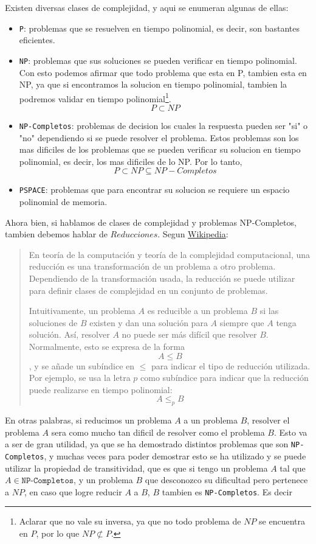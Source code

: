 Existen diversas clases de complejidad, y aqui se enumeran algunas de ellas:
\begin{itemize}
	\item \texttt{P}: problemas que se resuelven en tiempo polinomial, es decir, son bastantes eficientes.
	\item \texttt{NP}: problemas que sus soluciones se pueden verificar en tiempo polinomial. Con esto podemos afirmar que todo problema que esta en P, tambien esta en NP, ya que si encontramos la solucion en tiempo polinomial, tambien la podremos validar en tiempo polinomial\footnote{Aclarar que no vale su inversa, ya que no todo problema de $NP$ se encuentra en $P$, por lo que $NP \not\subset  P$.}.
    \[ P \subset NP\]
	\item \texttt{NP-Completos}: problemas de decision los cuales la respuesta pueden ser "si" o "no" dependiendo si se puede resolver el problema. Estos problemas son los mas dificiles de los problemas que se pueden verificar su solucion en tiempo polinomial, es decir, los mas dificiles de lo NP.
    Por lo tanto,
    \[ P \subset NP \subseteq NP-Completos\]
	\item \texttt{PSPACE}: problemas que para encontrar su solucion se requiere un espacio polinomial de memoria.
\end{itemize}
Ahora bien, si hablamos de clases de complejidad y problemas NP-Completos, tambien debemos hablar de $Reducciones$. Segun \href{https://es.wikipedia.org/wiki/Reducci%C3%B3n_(complejidad)}{Wikipedia}:
\begin{quote}
    En teoría de la computación y teoría de la complejidad computacional, una reducción es una transformación de un problema a otro problema. Dependiendo de la transformación usada, la reducción se puede utilizar para definir clases de complejidad en un conjunto de problemas.

    Intuitivamente, un problema $A$ es reducible a un problema $B$ si las soluciones de $B$ existen y dan una solución para $A$ siempre que $A$ tenga solución. Así, resolver $A$ no puede ser más difícil que resolver $B$. Normalmente, esto se expresa de la forma \[A \leq B\], y se añade un subíndice en $\le$ para indicar el tipo de reducción utilizada. Por ejemplo, se usa la letra $p$ como subíndice para indicar que la reducción puede realizarse en tiempo polinomial: \[A \leq _p B\]
\end{quote}

En otras palabras, si reducimos un problema $A$ a un problema $B$, resolver el problema $A$ sera como mucho tan dificil de resolver como el problema $B$. Esto va a ser de gran utilidad, ya que se ha demostrado distintos problemas que son \texttt{NP-Completos}, y muchas veces para poder demostrar esto se ha utilizado y se puede utilizar la propiedad de transitividad, que es que si tengo un problema $A$ tal que $A \in \texttt{NP-Completos}$, y un problema $B$ que desconozco su dificultad pero pertenece a $NP$, en caso que logre reducir $A$ a $B$, $B$ tambien es \texttt{NP-Completos}. Es decir

